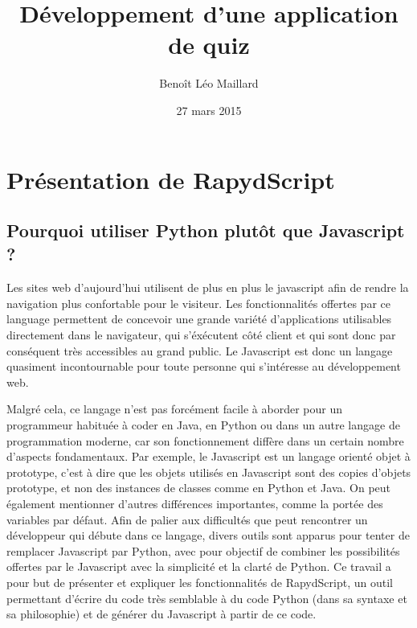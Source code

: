 \documentclass[a4,10pt,french]{sphinxmanual}
\title{Développement d'une application de quiz}
\date{27 mars 2015}
\author{Benoît Léo Maillard}
\begin{document}
\maketitle
\tableofcontents
{}\label{index::doc}



\chapter{Présentation de RapydScript}
\label{rapydscript:presentation-de-rapydscript}\label{rapydscript::doc}\label{rapydscript:application-de-creation-de-quiz}

\section{Pourquoi utiliser Python plutôt que Javascript ?}
\label{rapydscript:pourquoi-utiliser-python-plutot-que-javascript}
Les sites web d'aujourd'hui utilisent de plus en plus le javascript afin de rendre la navigation plus confortable pour le visiteur. Les fonctionnalités offertes par ce language permettent de concevoir une grande variété d'applications utilisables directement dans le navigateur, qui s'éxécutent côté client et qui sont donc par conséquent très accessibles au grand public. Le Javascript est donc un langage quasiment incontournable pour toute personne qui s'intéresse au développement web.

Malgré cela, ce langage n'est pas forcément facile à aborder pour un programmeur habituée à coder en Java, en Python ou dans un autre langage de programmation moderne, car son fonctionnement diffère dans un certain nombre d'aspects fondamentaux. Par exemple, le Javascript est un langage orienté objet à prototype, c'est à dire que les objets utilisés en Javascript sont des copies d'objets prototype, et non des instances de classes comme en Python et Java. On peut également mentionner d'autres différences importantes, comme la portée des variables par défaut. Afin de palier aux difficultés que peut rencontrer un développeur qui débute dans ce langage, divers outils sont apparus pour tenter de remplacer Javascript par Python, avec pour objectif de combiner les possibilités offertes par le Javascript avec la simplicité et la clarté de Python. Ce travail a pour but de présenter et expliquer les fonctionnalités de RapydScript, un outil permettant d'écrire du code très semblable à du code Python (dans sa syntaxe et sa philosophie) et de générer du Javascript à partir de ce code.
\end{document}
